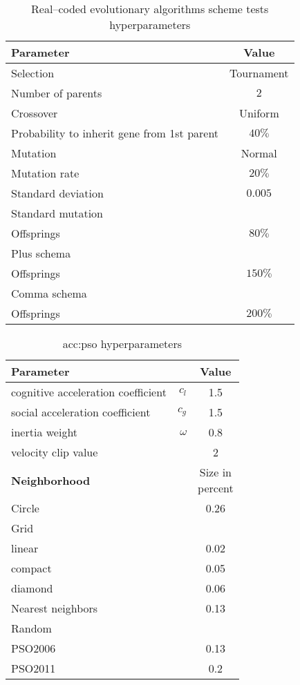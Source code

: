 \begin{table}[h]
    \centering
    \begin{tabular}{|l|c|}
        \hline
        \textbf{Parameter} & \textbf{Value} \\
        \hline
        Selection & Tournament \\
        \quad Number of parents & $2$ \\
        Crossover & Uniform \\
        \quad Probability to inherit gene from 1st parent & $40\%$ \\
        Mutation & Normal \\
        \quad Mutation rate & $20\%$ \\
        \quad Standard deviation & $0.005$ \\
        \hline
        Standard mutation & \\
        \quad Offsprings & $80\%$ \\
        Plus schema & \\
        \quad Offsprings & $150\%$ \\
        Comma schema & \\
        \quad Offsprings & $200\%$ \\
        \hline
    \end{tabular}
    \caption{Real--coded evolutionary algorithms scheme tests hyperparameters}
    \label{tab:esschemehyperparmarameters}
\end{table}

\begin{table}[h]
    \centering
    \begin{tabular}{|l r|c|}
        \hline
        \multicolumn{2}{|l|}{\textbf{Parameter}} & \textbf{Value} \\
        \hline
        cognitive acceleration coefficient & $c_l$ & 1.5 \\
        social acceleration coefficient  & $c_g$ & 1.5 \\
        inertia weight & $\omega$ & 0.8 \\
        velocity clip value & & 2 \\
        \hline \hline
        \textbf{Neighborhood} & & \makecell[c]{Size in\\ percent} \\
        \hline
        Circle & & 0.26 \\
        Grid & & \\
        \quad linear & & 0.02 \\
        \quad compact & & 0.05 \\
        \quad diamond & & 0.06 \\
        Nearest neighbors & & 0.13 \\
        Random & & \\
        \quad PSO2006 & & 0.13 \\
        \quad PSO2011 & & 0.2 \\ 
        \hline
    \end{tabular}
    \caption{\acrlong*{acc:pso} hyperparameters}
    \label{tab:psohyperparameters}
\end{table}